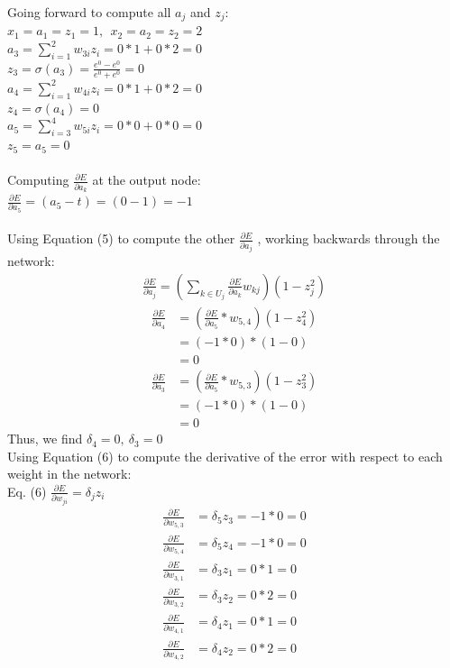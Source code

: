 \documentclass{article}
\begin{document}
Going forward to compute all $a_j$ and $z_j$: \\
$x_1 = a_1 = z_1 = 1,~~x_2 = a_2 = z_2 =  2$ \\
$a_3 = \sum_{i=1}^{2} w_{3i} z_{i} =  0*1 + 0*2 = 0   $ \\
$z_3 = \sigma(a_3) = \frac{e^0 - e^0}{e^0 + e^0} = 0$ \\
$a_4 = \sum_{i=1}^{2} w_{4i} z_{i} =  0*1 + 0*2 = 0   $ \\
$z_4 = \sigma(a_4) = 0 $ \\
$a_5 = \sum_{i=3}^{4} w_{5i} z_{i} =  0*0 + 0*0 = 0   $ \\
$z_5 = a_5 = 0$ \\
\\
Computing $\frac{\partial E}{\partial a_k}$ at the output node: \\
$\frac{\partial E}{\partial a_{5}} = \left( a_5 - t \right) = (0 - 1) = -1$ \\
\\
Using Equation (5) to compute the other $\frac{\partial E}{\partial a_j}$ , working backwards through the network: \\
\begin{align*}
\frac{\partial E}{\partial a_j} = \left( \sum_{k \in U_j} \frac{\partial E}{\partial a_k} w_{kj}  \right)(1-z_j^2)
\end{align*}
\begin{align*}
\frac{\partial E}{\partial a_4} &= \left( \frac{\partial E}{\partial a_5}*w_{5,4} \right)(1-z_4^2) \\
&= (-1*0)*(1-0) \\
&= 0
\end{align*}
\begin{align*}
\frac{\partial E}{\partial a_3} &= \left( \frac{\partial E}{\partial a_5}*w_{5,3} \right)(1-z_3^2) \\
&= (-1*0)*(1-0)\\
&= 0
\end{align*}
Thus, we find $\delta_4 = 0,~\delta_3 = 0$
\\
Using Equation (6) to compute the derivative of the error with respect to each weight in the network: \\
Eq. (6) $\frac{\partial E}{\partial w_{ji}} = \delta_j z_i$
\begin{align*}
\frac{\partial E}{\partial w_{5,3}} &= \delta_5 z_3 = -1*0 = 0 \\
\frac{\partial E}{\partial w_{5,4}} &= \delta_5 z_4 = -1*0 = 0 \\
\frac{\partial E}{\partial w_{3,1}} &= \delta_3 z_1 = 0*1 = 0 \\
\frac{\partial E}{\partial w_{3,2}} &= \delta_3 z_2 = 0*2 = 0 \\
\frac{\partial E}{\partial w_{4,1}} &= \delta_4 z_1 = 0*1 = 0 \\
\frac{\partial E}{\partial w_{4,2}} &= \delta_4 z_2 = 0*2 = 0
\end{align*}
\end{document}
